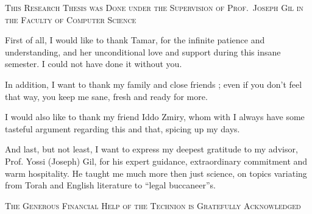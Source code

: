 \begin{center}
\textsc{This Research Thesis was Done under the Supervision of Prof.\ Joseph Gil in the Faculty of Computer Science}
\end{center}
\vspace{4ex}
First of all, I would like to thank Tamar, for the infinite patience and
understanding, and her unconditional love and support during this insane
semester.  I could not have done it without you.

In addition, I want to thank my family and close friends ; even if you don't
feel that way, you keep me sane, fresh and ready for more.

I would also like to thank my friend Iddo Zmiry, whom with I always have some
tasteful argument regarding this and that, spicing up my days.

And last, but not least, I want to express my deepest gratitude to my advisor,
Prof. Yossi (Joseph) Gil, for his expert guidance, extraordinary commitment and
warm hospitality.  He taught me much more then just science, on topics
variating from Torah and English literature to “legal buccaneer”s.

\vfill
\begin{center}
\textsc{The Generous Financial Help of the Technion is Gratefully Acknowledged}
\end{center}


